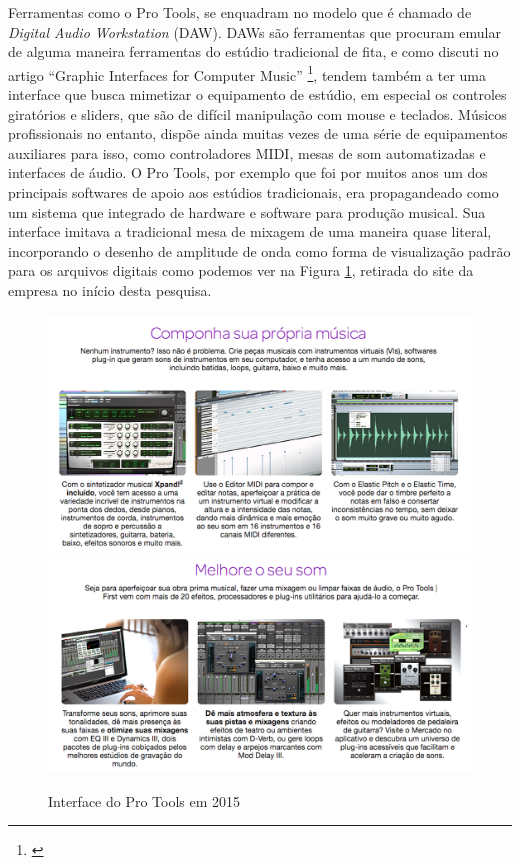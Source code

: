 {Ferramentas como o Pro Tools, se enquadram no modelo que é chamado de \emph{Digital Audio Workstation} (DAW). DAWs são ferramentas que procuram emular de alguma maneira ferramentas do estúdio tradicional de fita, e como discuti no artigo ``Graphic Interfaces for Computer Music'' \footnote{\cite{Stolfi2016}}, tendem também a ter uma interface que busca mimetizar o equipamento de estúdio, em especial os controles giratórios e sliders, que são de difícil manipulação com mouse e teclados. Músicos profissionais no entanto, dispõe ainda muitas vezes de uma série de equipamentos auxiliares para isso, como controladores MIDI, mesas de som automatizadas e interfaces de áudio. O Pro Tools, por exemplo que foi por muitos anos um dos principais softwares de apoio aos estúdios tradicionais, era propagandeado como um sistema que integrado de hardware e software para produção musical. Sua interface imitava a tradicional mesa de mixagem de uma maneira quase literal, incorporando o desenho de amplitude de onda como forma de visualização padrão para os arquivos digitais como podemos ver na Figura \ref{protools}, retirada do site da empresa no início desta pesquisa.


\begin{figure}
    \caption{\label{protools}Interface do Pro Tools em 2015 }
    
        \includegraphics[width=0.8\linewidth]{pictures/protools}
        \includegraphics[width=0.8\linewidth]{pictures/protools2}
    

\end{figure}}
